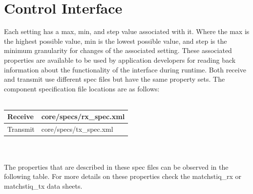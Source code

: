 \section{Control Interface}
Each setting has a max, min, and step value associated with it.  Where the max is the highest possible value, min is the lowest possible value, and step is the minimum granularity for changes of the associated setting.  These associated properties are available to be used by application developers for reading back information about the functionality of the interface during runtime.  Both receive and transmit use different spec files but have the same property sets. The component specification file locations are as follows: \\ \\
   \begin{tabular}{|p{2cm}|p{7cm}|}
      \hline
      Receive & core/specs/rx\_spec.xml \\
      \hline
      Transmit & core/specs/tx\_spec.xml  \\
      \hline
   \end{tabular}
   \\ \medskip \\
The properties that are described in these spec files can be observed in the following table.  For more details on these properties check the matchstiq\_rx or matchstiq\_tx data sheets. \\ \\
